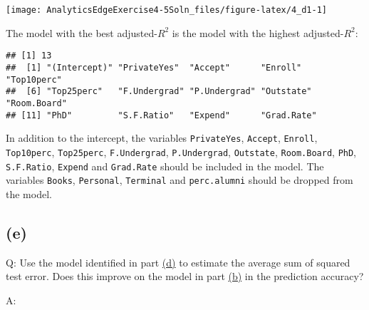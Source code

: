 \documentclass[
]{article}
\newenvironment{Shaded}{\begin{snugshade}}{\end{snugshade}}
\newcommand{\DecValTok}[1]{\textcolor[rgb]{0.00,0.00,0.81}{#1}}
\newcommand{\KeywordTok}[1]{\textcolor[rgb]{0.13,0.29,0.53}{\textbf{#1}}}
\newcommand{\NormalTok}[1]{#1}
\newcommand{\OperatorTok}[1]{\textcolor[rgb]{0.81,0.36,0.00}{\textbf{#1}}}
\newcommand{\StringTok}[1]{\textcolor[rgb]{0.31,0.60,0.02}{#1}}
\begin{document}
\begin{center}\texttt{[image: AnalyticsEdgeExercise4-5Soln\_files/figure-latex/4\_d1-1]} \end{center}

The model with the best adjusted-\(R^{2}\) is the model with the highest
adjusted-\(R^{2}\):

\begin{Shaded}
\end{Shaded}

\begin{verbatim}
## [1] 13
##  [1] "(Intercept)" "PrivateYes"  "Accept"      "Enroll"      "Top10perc"  
##  [6] "Top25perc"   "F.Undergrad" "P.Undergrad" "Outstate"    "Room.Board" 
## [11] "PhD"         "S.F.Ratio"   "Expend"      "Grad.Rate"
\end{verbatim}

In addition to the intercept, the variables \texttt{PrivateYes},
\texttt{Accept}, \texttt{Enroll}, \texttt{Top10perc},
\texttt{Top25perc}, \texttt{F.Undergrad}, \texttt{P.Undergrad},
\texttt{Outstate}, \texttt{Room.Board}, \texttt{PhD},
\texttt{S.F.Ratio}, \texttt{Expend} and \texttt{Grad.Rate} should be
included in the model. The variables \texttt{Books}, \texttt{Personal},
\texttt{Terminal} and \texttt{perc.alumni} should be dropped from the
model.


\hypertarget{e-1}{%
\subsection{(e)}\label{e-1}}

Q: Use the model identified in part \protect\hyperlink{fourd}{(d)} to
estimate the average sum of squared test error. Does this improve on the
model in part \protect\hyperlink{fourb}{(b)} in the prediction accuracy?

A:
\end{document}
